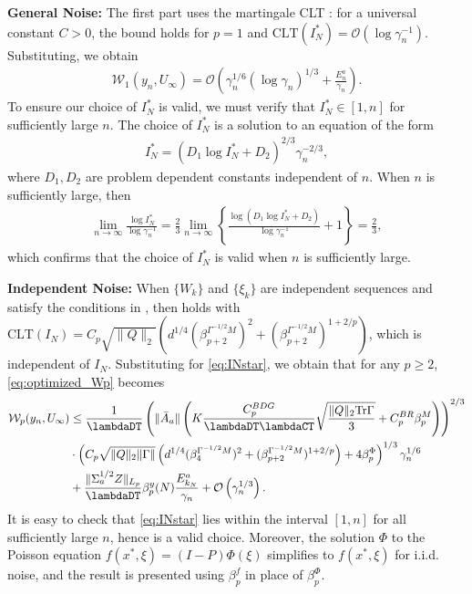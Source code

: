 \documentclass[11pt]{article}
\begin{document}
\textbf{General Noise:}
The first part uses the martingale CLT : for a universal constant $C>0$, the bound holds for $p = 1$ and $\mathrm{CLT}(I_N^*) = \mathcal{O}(\log \gamma_n^{-1})$.
Substituting, we obtain
\begin{align*}
    \mathcal{W}_1 (y_n, U_\infty) 
    = \mathcal{O}\left(\gamma_n^{1/6} \left(\log \gamma_n \right)^{1/3} + \frac{E_n^a}{\gamma_n} \right) .
\end{align*}
To ensure our choice of $I_N^*$ is valid, we must verify that $I_N^* \in [1, n]$ for sufficiently large $n$. 
The choice of $I_N^*$ is a solution to an equation of the form 
\begin{align*}
    I_N^* = \left(D_1 \log I_N^* + D_2 \right)^{2/3} \gamma_n^{-2/3} , 
\end{align*}
where $D_1, D_2$ are problem dependent constants independent of $n$. 
When $n$ is sufficiently large, then 
\begin{align*}
    \lim_{n \to \infty} \frac{\log I_N^*}{\log \gamma_n^{-1}} 
    = 
    \frac{2}{3}\lim_{n \to \infty} \left\{ \frac{\log \left( D_1 \log I_N^* + D_2\right)}{\log \gamma_n^{-1}} + 1\right\}
    = \frac{2}{3} , 
\end{align*}
which confirms that the choice of $I_N^*$ is valid when $n$ is sufficiently large. 




\textbf{Independent Noise:}
When $\{W_k\}$ and $\{\xi_k\}$ are independent sequences and satisfy the conditions in , then  holds with $\mathrm{CLT}(I_N) = C_p \sqrt{\lVert Q \rVert_2} (d^{1/4} (\beta_{p+2}^{\Gamma^{-1/2}M})^2 + (\beta_{p+2}^{\Gamma^{-1/2}M})^{1+2/p})$, which is independent of $I_N$.
Substituting for \eqref{eq:INstar}, we obtain that for any $p \geq 2$, \eqref{eq:optimized_Wp} becomes
\begin{align*}
    \mathcal{W}_p (y_n, U_\infty) 
    &\leq
    \frac{1}{\lambdaDT} \left(\lVert \bar{A}_a \rVert \left(K\frac{C_p^{BDG}}{\lambdaDT \lambdaCT} \sqrt{\frac{\lVert Q \rVert_2\mathrm{Tr} \Gamma}{3}}  + C_p^{BR} \beta_p^M \right) \right)^{2/3}  
    \\ 
    &\cdot 
    \left( C_p \sqrt{\lVert Q \rVert_2 \lVert \Gamma \rVert}
        \left(d^{1/4} (\beta_4^{\Gamma^{-1/2}M})^2 + (\beta_{p+2}^{\Gamma^{-1/2}M})^{1+2/p} \right)  
        + 4 \beta_p^\Phi  \right)^{1/3} \gamma_n^{1/6}
    \\ 
    &+
    \frac{\lVert \Sigma_a^{1/2}Z\rVert_{L_p}}{\lambdaDT} \beta_p^y (N) \frac{E_{k_N}^a}{\gamma_n}
    + 
    \mathcal{O}\left( \gamma_n^{1/3} \right).     
\end{align*}
It is easy to check that \eqref{eq:INstar} lies within the interval $[1, n]$ for all sufficiently large $n$, hence is a valid choice. 
Moreover, the solution $\Phi$ to the Poisson equation $f(x^*, \xi)  = (I - P)\Phi(\xi) $ simplifies to $f(x^*, \xi)$ for i.i.d. noise, and the result is presented using $\beta_p^f$ in place of $\beta_p^\Phi$.
\end{document}
